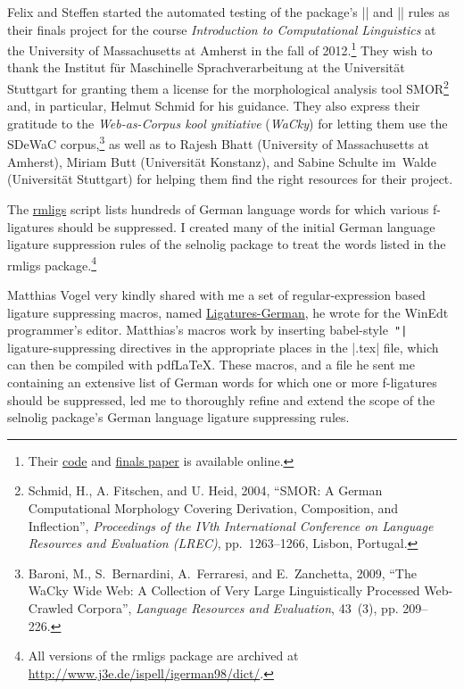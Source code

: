 \documentclass[11pt]{article}
\newcommand{\pkg}[1]{\textsf{#1}}
\begin{document}
Felix and Steffen started the automated testing of the package's |\nolig| and |\keeplig| rules as their finals project for the course \emph{Introduction to Computational Linguistics} at the University of Massachusetts at Amherst in the fall of 2012.\footnote{Their \href{https://github.com/SHildebrandt/selnolig-check}{code} and \href{https://github.com/SHildebrandt/selnolig-check/blob/master/selnolig-check-documentation.pdf?raw=true}{finals paper} is available online.} They wish to thank the Institut für Maschinelle Sprachverarbeitung at the Universität Stuttgart for granting them a license for the morphological analysis tool SMOR\footnote{Schmid, H., A. Fitschen, and U. Heid, 2004, \enquote{SMOR: A German Computational Morphology Covering Derivation, Composition, and Inflection}, \emph{Proceedings of the IVth International Conference on Language Resources and Evaluation (LREC)}, pp.~1263--1266, Lisbon, Portugal.} and, in particular, Helmut Schmid for his guidance. They also express their gratitude to the \emph{Web-as-Corpus kool ynitiative} (\emph{WaCky}) for letting them use the SDeWaC corpus,\footnote{Baroni, M., S.~Bernardini, A.~Ferraresi, and E.~Zanchetta, 2009, \enquote{The WaCky Wide Web: A Collection of Very Large Linguistically Processed Web-Crawled Corpora}, \emph{Language Resources and Evaluation}, 43~(3), pp. 209--226.} as well as to Rajesh Bhatt (University of Massachusetts at Amherst), Miriam Butt (Universität Konstanz), and Sabine Schulte im~Walde (Universität Stuttgart) for helping them find the right resources for their project.

The \href{http://www.ctan.org/tex-archive/support/rmligs}{\pkg{rmligs}} script lists hundreds of German language words for which various f\nobreak-liga\-tures should be suppressed. I created many of the initial German language ligature suppression rules of the \pkg{selnolig} package to treat the words listed in the \pkg{rmligs} package.\footnote{All versions of the \pkg{rmligs} package are archived at \url{http://www.j3e.de/ispell/igerman98/dict/}.} 

Matthias Vogel very kindly shared with me a set of regular-expression based ligature suppressing macros, named \href{http://www.winedt.org/Macros/LaTeX/Ligatures-German.php}{Ligatures-German}, he wrote for the WinEdt programmer's editor. Matthias's macros work by inserting \pkg{babel}-style~\Verb+"|+ ligature-suppressing  directives in the appropriate places in the |.tex| file, which can then be compiled with pdf\LaTeX. These macros, and a file he sent me containing an extensive list of German words for which one or more f-ligatures should be suppressed, led me to thoroughly refine and extend the scope of the \pkg{selnolig} package's German language ligature suppressing rules.
\end{document}
